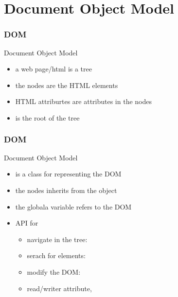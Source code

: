 \section{Document Object Model}

\begin{frame}[fragile]
\frametitle{DOM}
\color{structure}
Document Object Model\\
\begin{itemize}\color{structure}
  \item a web page/html is a tree
  \item the nodes are the HTML elements
  \item HTML attriburtes are attributes in the nodes
  \item {} is the root of the tree
\end{itemize}
\end{frame}

\begin{frame}[fragile]
\frametitle{DOM}
\color{structure}
Document Object Model\\
\begin{itemize}\color{structure}
\item {} is a class for representing the DOM
\item the nodes inherits from the  object
\item the globala variable  refers to the DOM
\item API for
  \begin{itemize}
    \item navigate in the tree: 
    \item serach for elements: 
    \item modify the DOM: 
    \item read/writer attribute, 
  \end{itemize}
\end{itemize}
\end{frame}

